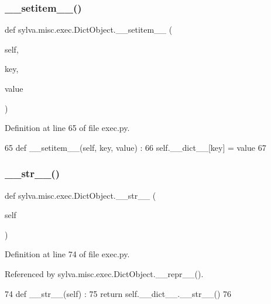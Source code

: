 \subsubsection{\texorpdfstring{\+\_\+\+\_\+setitem\+\_\+\+\_\+()}{\_\_setitem\_\_()}}
{\footnotesize\ttfamily def sylva.\+misc.\+exec.\+Dict\+Object.\+\_\+\+\_\+setitem\+\_\+\+\_\+ (\begin{DoxyParamCaption}\item[{}]{self,  }\item[{}]{key,  }\item[{}]{value }\end{DoxyParamCaption})}



Definition at line 65 of file exec.\+py.


\begin{DoxyCode}
65   \textcolor{keyword}{def }\_\_setitem\_\_(self, key, value) :
66     self.\_\_dict\_\_[key] = value
67 
\end{DoxyCode}
\mbox{\label{classsylva_1_1misc_1_1exec_1_1_dict_object_a7c974971714369cdba35b66479addd71}} 
\subsubsection{\texorpdfstring{\+\_\+\+\_\+str\+\_\+\+\_\+()}{\_\_str\_\_()}}
{\footnotesize\ttfamily def sylva.\+misc.\+exec.\+Dict\+Object.\+\_\+\+\_\+str\+\_\+\+\_\+ (\begin{DoxyParamCaption}\item[{}]{self }\end{DoxyParamCaption})}



Definition at line 74 of file exec.\+py.



Referenced by sylva.\+misc.\+exec.\+Dict\+Object.\+\_\+\+\_\+repr\+\_\+\+\_\+().


\begin{DoxyCode}
74   \textcolor{keyword}{def }\_\_str\_\_(self) :
75     \textcolor{keywordflow}{return} self.\_\_dict\_\_.\_\_str\_\_()
76 
\end{DoxyCode}
\mbox{\label{classsylva_1_1misc_1_1exec_1_1_dict_object_a8a81846b980700e7552d76f4fa1eff1e}} 
